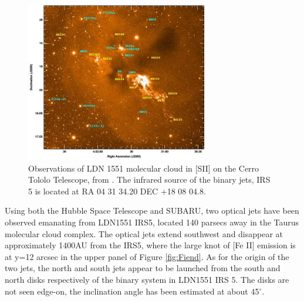\begin{figure}[t]
\centering
\includegraphics[width=\textwidth]{LDN1551Cloud}
\caption{
Observations of LDN 1551 molecular cloud in [SII] on the Cerro Tololo Telescope, from \citet{2005prpl.conf.8527M}. The infrared source of the binary jets, IRS 5 is located at  RA 04 31 34.20 DEC  +18 08 04.8.
}
\label{fig:Cloud} 
\end{figure}

Using both the Hubble Space Telescope and SUBARU, two optical jets have been observed emanating from LDN1551 IRS5, located 140 parsecs away in the Taurus molecular cloud complex. 
The optical jets extend southwest and disappear
 at  approximately 1400AU from the IRS5, where the large knot of [Fe II] emission is at y=12 arcsec in the upper panel of Figure \ref{fig:Fiend}.
 As for the origin of the two jets, 
 the north and south jets appear to be launched from the south and north disks respectively of the binary system in LDN1551 IRS 5.
 The disks are not seen edge-on, the inclination angle has been estimated at about 45$^{\circ}$.

